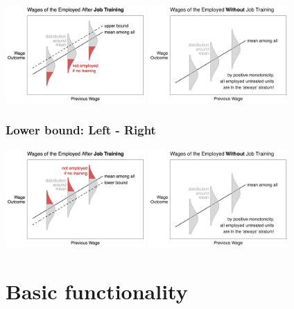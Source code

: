 \documentclass[
]{book}
\begin{document}
\includegraphics[width=0.4\textwidth,height=\textheight]{assets/teach_jobtrain_upper.png}
\includegraphics[width=0.4\textwidth,height=\textheight]{assets/teach_jobtrain_control.png}

\hypertarget{lower-bound-left---right}{%
\subsection{Lower bound: Left - Right}\label{lower-bound-left---right}}

\includegraphics[width=0.4\textwidth,height=\textheight]{assets/teach_jobtrain_lower.png}
\includegraphics[width=0.4\textwidth,height=\textheight]{assets/teach_jobtrain_control.png}

\hypertarget{basic-functionality}{%
\chapter{Basic functionality}\label{basic-functionality}}
\end{document}
